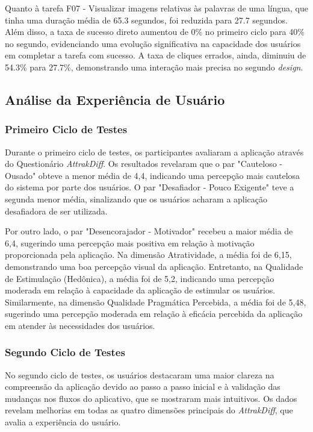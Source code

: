 Quanto à tarefa F07 - Visualizar imagens relativas às palavras de uma língua, que tinha uma duração média de 65.3 segundos, foi reduzida para 27.7 segundos. Além disso, a taxa de sucesso direto aumentou de 0\% no primeiro ciclo para 40\% no segundo, evidenciando uma evolução 
significativa na capacidade dos usuários em completar a tarefa com sucesso. A taxa de cliques errados, ainda, diminuiu de 54.3\% para 27.7\%, demonstrando uma interação mais precisa no segundo \textit{design}.

\subsection{Análise da Experiência de Usuário}
\label{sec:Análise da Experiência de Usuário}

\subsubsection{Primeiro Ciclo de Testes}
\label{sec:Primeiro Ciclo de Testes2}
Durante o primeiro ciclo de testes, os participantes avaliaram a aplicação através do Questionário \textit{AttrakDiff}. Os resultados revelaram que o par "Cauteloso - Ousado" obteve a menor média de 4,4, indicando uma percepção mais cautelosa do sistema por parte dos usuários. O par 
"Desafiador - Pouco Exigente" teve a segunda menor média, sinalizando que os usuários acharam a aplicação desafiadora de ser utilizada.

Por outro lado, o par "Desencorajador - Motivador" recebeu a maior média de 6,4, sugerindo uma percepção mais positiva em relação à motivação proporcionada pela aplicação. Na dimensão Atratividade, a média foi de 6,15, demonstrando uma boa percepção visual da aplicação. Entretanto, 
na Qualidade de Estimulação (Hedônica), a média foi de 5,2, indicando uma percepção moderada em relação à capacidade da aplicação de estimular os usuários. Similarmente, na dimensão Qualidade Pragmática Percebida, a média foi de 5,48, sugerindo uma percepção moderada em relação à 
eficácia percebida da aplicação em atender às necessidades dos usuários.

\subsubsection{Segundo Ciclo de Testes}
\label{sec:Segundo Ciclo de Testes2}
No segundo ciclo de testes, os usuários destacaram uma maior clareza na compreensão da aplicação devido ao passo a passo inicial e à validação das mudanças nos fluxos do aplicativo, que se mostraram mais intuitivos. Os dados revelam melhorias em todas as quatro dimensões principais do 
\textit{AttrakDiff}, que avalia a experiência do usuário. 

